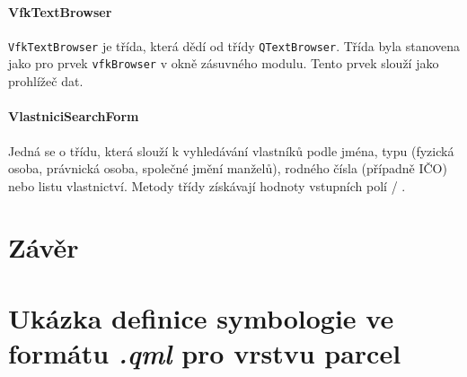 \documentclass[a4paper,12pt,oneside]{book}
\begin{document}
\subsubsection{VfkTextBrowser}
\texttt{VfkTextBrowser} je třída, která dědí od třídy \texttt{QTextBrowser}. Třída byla stanovena jako  pro prvek \texttt{vfkBrowser} v okně zásuvného modulu. Tento prvek slouží jako prohlížeč dat.

\subsubsection{VlastniciSearchForm}
Jedná se o třídu, která slouží k vyhledávání vlastníků podle jména, typu (fyzická osoba, právnická osoba, společné jmění manželů), rodného čísla (případně IČO) nebo listu vlastnictví. Metody třídy získávají hodnoty vstupních polí / .


\clearpage
\chapter*{Závěr}

\clearpage
\rhead{{\rightmark}}	%
\renewcommand{\refname}{Použitá literatura}



\clearpage
\listoffigures

\clearpage
\listoftables

\clearpage
\lstlistoflistings

\newpage
\appendix

\setcounter{page}{1}   	%

\chapter{Ukázka definice symbologie ve formátu \textit{.qml} pro vrstvu parcel}
\label{l_priloha_symbologie}
\end{document}
